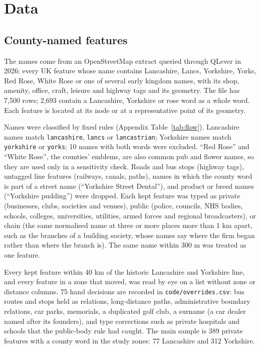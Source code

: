 \documentclass[11pt,a4paper]{article}
\begin{document}
\section{Data}\label{sec:data}
\subsection{County-named features}
The names come from an OpenStreetMap extract \citep{osm2026} queried through QLever in 2026: every UK feature whose name contains Lancashire, Lancs, Yorkshire, Yorks, Red Rose, White Rose or one of several early kingdom names, with its shop, amenity, office, craft, leisure and highway tags and its geometry. The file has 7,500 rows; 2,693 contain a Lancashire, Yorkshire or rose word as a whole word. Each feature is located at its node or at a representative point of its geometry.

Names were classified by fixed rules (Appendix Table~\ref{tab:flow}). Lancashire names match \texttt{lancashire}, \texttt{lancs} or \texttt{lancastrian}; Yorkshire names match \texttt{yorkshire} or \texttt{yorks}; 10 names with both words were excluded. ``Red Rose'' and ``White Rose'', the counties' emblems, are also common pub and flower names, so they are used only in a sensitivity check. Roads and bus stops (highway tags), untagged line features (railways, canals, paths), names in which the county word is part of a street name (``Yorkshire Street Dental''), and product or breed names (``Yorkshire pudding'') were dropped. Each kept feature was typed as private (businesses, clubs, societies and venues), public (police, councils, NHS bodies, schools, colleges, universities, utilities, armed forces and regional broadcasters), or chain (the same normalised name at three or more places more than 1 km apart, such as the branches of a building society, whose names say where the firm began rather than where the branch is). The same name within 300 m was treated as one feature.

Every kept feature within 40 km of the historic Lancashire and Yorkshire line, and every feature in a zone that moved, was read by eye on a list without zone or distance columns. 75 hand decisions are recorded in \texttt{code/overrides.csv}: bus routes and stops held as relations, long-distance paths, administrative boundary relations, car parks, memorials, a duplicated golf club, a surname (a car dealer named after its founders), and type corrections such as private hospitals and schools that the public-body rule had caught. The main sample is 389 private features with a county word in the study zones: 77 Lancashire and 312 Yorkshire.
\end{document}
